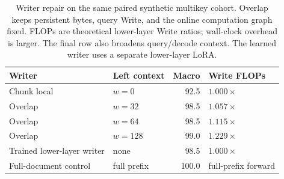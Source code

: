 \begin{table}[htbp]
\centering
\small
\setlength{\tabcolsep}{4pt}
\begin{tabular}{@{}llrl@{}}
\toprule
Writer & Left context & Macro & Write FLOPs \\
\midrule
Chunk local & $w=0$ & 92.5 & $1.000\times$ \\
Overlap & $w=32$ & 98.5 & $1.057\times$ \\
Overlap & $w=64$ & 98.5 & $1.115\times$ \\
Overlap & $w=128$ & 99.0 & $1.229\times$ \\
Trained lower-layer writer & none & 98.5 & $1.000\times$ \\
Full-document control & full prefix & 100.0 & full-prefix forward \\
\bottomrule
\end{tabular}
\caption{Writer repair on the same paired synthetic multikey cohort. Overlap keeps persistent bytes, query Write, and the online computation graph fixed. FLOPs are theoretical lower-layer Write ratios; wall-clock overhead is larger. The final row also broadens query/decode context. The learned writer uses a separate lower-layer LoRA.}
\label{tab:overlap}
\end{table}
